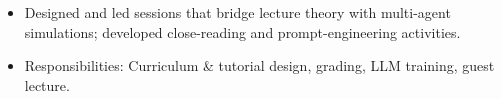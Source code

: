 
\begin{itemize}
  \item Designed and led sessions that bridge lecture theory with multi-agent simulations; developed close-reading and prompt-engineering activities.
\end{itemize}

\begin{itemize}
  \item Responsibilities: Curriculum \& tutorial design, grading, LLM training, guest lecture.
\end{itemize}



